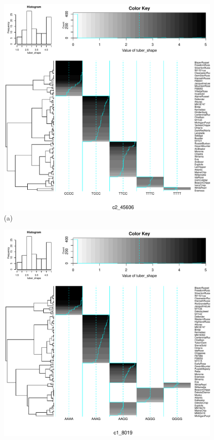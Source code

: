 \documentclass{article}
\begin{document}
\begin{figure}[H]
\noindent\begin{minipage}[t]{1\columnwidth}%
\begin{minipage}[t]{0.5\columnwidth}%
\begin{center}
\includegraphics[scale=0.3]{images/out-SNPProfile-c2_45606.pdf}\\
(a)
\par\end{center}%
\end{minipage}%
\begin{minipage}[t]{0.5\columnwidth}%
\begin{center}
\includegraphics[scale=0.3]{images/out-SNPProfile-c1_8019.pdf}\\

\end{center}
\end{minipage}
\end{minipage}
\end{figure}
\end{document}

